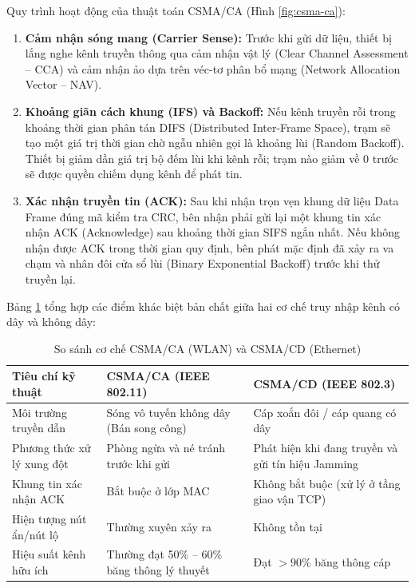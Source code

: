 Quy trình hoạt động của thuật toán CSMA/CA (Hình \ref{fig:csma-ca}):
\begin{enumerate}
    \item \textbf{Cảm nhận sóng mang (Carrier Sense):} Trước khi gửi dữ liệu, thiết bị lắng nghe kênh truyền thông qua cảm nhận vật lý (Clear Channel Assessment -- CCA) và cảm nhận ảo dựa trên véc-tơ phân bổ mạng (Network Allocation Vector -- NAV).
    \item \textbf{Khoảng giãn cách khung (IFS) và Backoff:} Nếu kênh truyền rỗi trong khoảng thời gian phân tán DIFS (Distributed Inter-Frame Space), trạm sẽ tạo một giá trị thời gian chờ ngẫu nhiên gọi là khoảng lùi (Random Backoff). Thiết bị giảm dần giá trị bộ đếm lùi khi kênh rỗi; trạm nào giảm về 0 trước sẽ được quyền chiếm dụng kênh để phát tin.
    \item \textbf{Xác nhận truyền tin (ACK):} Sau khi nhận trọn vẹn khung dữ liệu Data Frame đúng mã kiểm tra CRC, bên nhận phải gửi lại một khung tin xác nhận ACK (Acknowledge) sau khoảng thời gian SIFS ngắn nhất. Nếu không nhận được ACK trong thời gian quy định, bên phát mặc định đã xảy ra va chạm và nhân đôi cửa sổ lùi (Binary Exponential Backoff) trước khi thử truyền lại.
\end{enumerate}

Bảng \ref{tab:csma_compare} tổng hợp các điểm khác biệt bản chất giữa hai cơ chế truy nhập kênh có dây và không dây:

\begin{table}[htbp]
\centering
\caption{So sánh cơ chế CSMA/CA (WLAN) và CSMA/CD (Ethernet)}
\label{tab:csma_compare}
\small
\begin{tabular}{lll}
\toprule
\textbf{Tiêu chí kỹ thuật} & \textbf{CSMA/CA (IEEE 802.11)} & \textbf{CSMA/CD (IEEE 802.3)} \\
\midrule
Môi trường truyền dẫn & Sóng vô tuyến không dây (Bán song công) & Cáp xoắn đôi / cáp quang có dây \\
Phương thức xử lý xung đột & Phòng ngừa và né tránh trước khi gửi & Phát hiện khi đang truyền và gửi tín hiệu Jamming \\
Khung tin xác nhận ACK & Bắt buộc ở lớp MAC & Không bắt buộc (xử lý ở tầng giao vận TCP) \\
Hiện tượng nút ẩn/nút lộ & Thường xuyên xảy ra & Không tồn tại \\
Hiệu suất kênh hữu ích & Thường đạt 50\% -- 60\% băng thông lý thuyết & Đạt $>90\%$ băng thông cáp \\
\bottomrule
\end{tabular}
\end{table}


